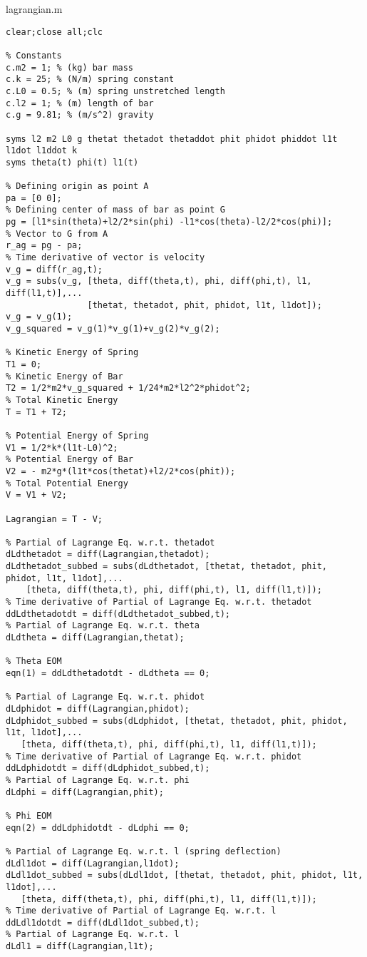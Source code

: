 lagrangian.m
\begin{lstlisting}[frame=lines,style=Matlab-editor,basicstyle = \mlttfamily]
clear;close all;clc

% Constants
c.m2 = 1; % (kg) bar mass
c.k = 25; % (N/m) spring constant
c.L0 = 0.5; % (m) spring unstretched length
c.l2 = 1; % (m) length of bar
c.g = 9.81; % (m/s^2) gravity

syms l2 m2 L0 g thetat thetadot thetaddot phit phidot phiddot l1t l1dot l1ddot k
syms theta(t) phi(t) l1(t)

% Defining origin as point A
pa = [0 0];
% Defining center of mass of bar as point G
pg = [l1*sin(theta)+l2/2*sin(phi) -l1*cos(theta)-l2/2*cos(phi)];
% Vector to G from A
r_ag = pg - pa;
% Time derivative of vector is velocity
v_g = diff(r_ag,t);
v_g = subs(v_g, [theta, diff(theta,t), phi, diff(phi,t), l1, diff(l1,t)],...
                [thetat, thetadot, phit, phidot, l1t, l1dot]);
v_g = v_g(1);
v_g_squared = v_g(1)*v_g(1)+v_g(2)*v_g(2);

% Kinetic Energy of Spring
T1 = 0;
% Kinetic Energy of Bar
T2 = 1/2*m2*v_g_squared + 1/24*m2*l2^2*phidot^2;
% Total Kinetic Energy
T = T1 + T2;

% Potential Energy of Spring
V1 = 1/2*k*(l1t-L0)^2;
% Potential Energy of Bar
V2 = - m2*g*(l1t*cos(thetat)+l2/2*cos(phit));
% Total Potential Energy
V = V1 + V2;

Lagrangian = T - V;

% Partial of Lagrange Eq. w.r.t. thetadot
dLdthetadot = diff(Lagrangian,thetadot);
dLdthetadot_subbed = subs(dLdthetadot, [thetat, thetadot, phit, phidot, l1t, l1dot],...
    [theta, diff(theta,t), phi, diff(phi,t), l1, diff(l1,t)]);
% Time derivative of Partial of Lagrange Eq. w.r.t. thetadot
ddLdthetadotdt = diff(dLdthetadot_subbed,t);
% Partial of Lagrange Eq. w.r.t. theta
dLdtheta = diff(Lagrangian,thetat);

% Theta EOM
eqn(1) = ddLdthetadotdt - dLdtheta == 0;

% Partial of Lagrange Eq. w.r.t. phidot
dLdphidot = diff(Lagrangian,phidot);
dLdphidot_subbed = subs(dLdphidot, [thetat, thetadot, phit, phidot, l1t, l1dot],...
   [theta, diff(theta,t), phi, diff(phi,t), l1, diff(l1,t)]);
% Time derivative of Partial of Lagrange Eq. w.r.t. phidot
ddLdphidotdt = diff(dLdphidot_subbed,t);
% Partial of Lagrange Eq. w.r.t. phi
dLdphi = diff(Lagrangian,phit);

% Phi EOM
eqn(2) = ddLdphidotdt - dLdphi == 0;

% Partial of Lagrange Eq. w.r.t. l (spring deflection)
dLdl1dot = diff(Lagrangian,l1dot);
dLdl1dot_subbed = subs(dLdl1dot, [thetat, thetadot, phit, phidot, l1t, l1dot],...
   [theta, diff(theta,t), phi, diff(phi,t), l1, diff(l1,t)]);
% Time derivative of Partial of Lagrange Eq. w.r.t. l
ddLdl1dotdt = diff(dLdl1dot_subbed,t);
% Partial of Lagrange Eq. w.r.t. l
dLdl1 = diff(Lagrangian,l1t);


\end{lstlisting}
